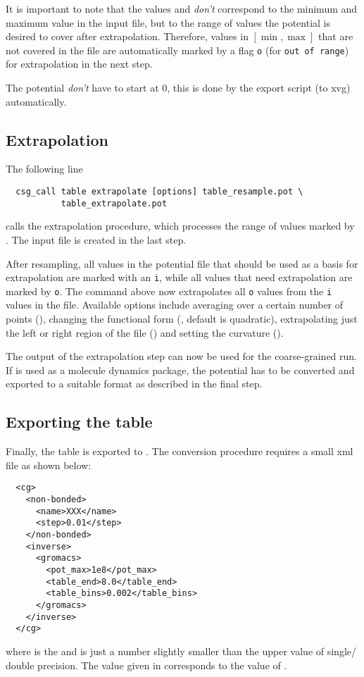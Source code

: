 It is important to note that the values  and  \textit{don't} correspond to the minimum and maximum value in the input file, but to the range of values the potential is desired to cover after extrapolation. Therefore, values in $[ \min,\max ]$ that are not covered in the file are automatically marked by a flag \texttt{o} (for \texttt{out of range}) for extrapolation in the next step.

The potential \textit{don't} have to start at 0, this is done by the export script (to xvg) automatically.

\subsection{Extrapolation}
The following line
\begin{verbatim}
  csg_call table extrapolate [options] table_resample.pot \
           table_extrapolate.pot
\end{verbatim}
calls the extrapolation procedure, which processes the range of values marked by . The input file is  created in the last step.

After resampling, all values in the potential file that should be used as a basis for extrapolation are marked with an \texttt{i}, while all values that need extrapolation are marked by \texttt{o}. The command above now extrapolates all \texttt{o} values from the \texttt{i} values in the file. Available options include averaging over a certain number of points (), changing the functional form (, default is quadratic), extrapolating just the left or right region of the file () and setting the curvature ().

The output  of the extrapolation step can now be used for the coarse-grained run. If \gromacs is used as a molecule dynamics package, the potential has to be converted and exported to a suitable \gromacs format as described in the final step.

\subsection{Exporting the table}
Finally, the table is exported to . The conversion procedure requires a small xml file  as shown below:
\begin{verbatim}
  <cg>
    <non-bonded>
      <name>XXX</name>
      <step>0.01</step>
    </non-bonded>
    <inverse>
      <gromacs>
        <pot_max>1e8</pot_max>
        <table_end>8.0</table_end>
        <table_bins>0.002</table_bins>
      </gromacs>
    </inverse>
  </cg>
\end{verbatim}
where  is the \gromacs {} and  is just a number slightly smaller than the upper value of single/ double precision. The value given in  corresponds to the  value of .

